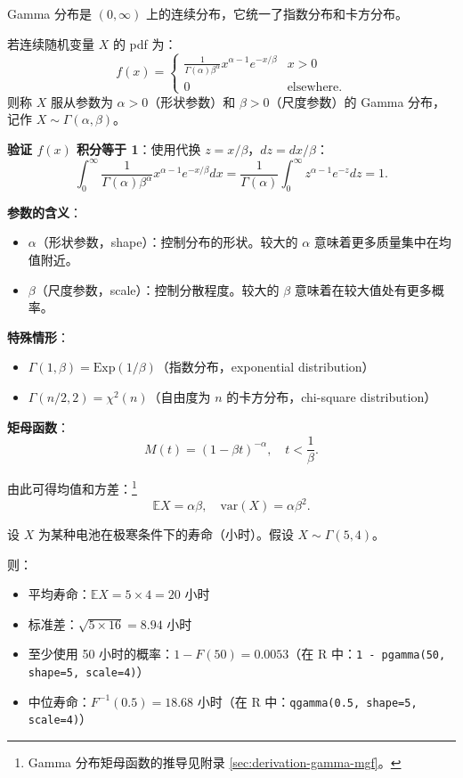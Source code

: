 Gamma 分布是 $(0, \infty)$ 上的连续分布，它统一了指数分布和卡方分布。

\begin{definition}[Gamma 分布]\label{def:gamma-distribution-ch3}
若连续随机变量 $X$ 的 pdf 为：
\[
f(x) = \begin{cases}
\frac{1}{\Gamma(\alpha)\beta^{\alpha}} x^{\alpha-1} e^{-x/\beta} & x > 0 \\[4pt]
0 & \text{elsewhere}.
\end{cases}
\label{eq:gamma-pdf-ch3}
\]
则称 $X$ 服从参数为 $\alpha > 0$（形状参数）和 $\beta > 0$（尺度参数）的 Gamma 分布，记作 $X \sim \Gamma(\alpha, \beta)$。
\end{definition}

\textbf{验证 $f(x)$ 积分等于 1}：使用代换 $z = x/\beta$，$dz = dx/\beta$：
\[
\int_{0}^{\infty} \frac{1}{\Gamma(\alpha)\beta^{\alpha}} x^{\alpha-1} e^{-x/\beta} dx = \frac{1}{\Gamma(\alpha)} \int_{0}^{\infty} z^{\alpha-1} e^{-z} dz = 1.
\]

\textbf{参数的含义}：
\begin{itemize}
\item $\alpha$（形状参数，shape）：控制分布的形状。较大的 $\alpha$ 意味着更多质量集中在均值附近。
\item $\beta$（尺度参数，scale）：控制分散程度。较大的 $\beta$ 意味着在较大值处有更多概率。
\end{itemize}

\textbf{特殊情形}：
\begin{itemize}
\item $\Gamma(1, \beta) = \text{Exp}(1/\beta)$（指数分布，exponential distribution）
\item $\Gamma(n/2, 2) = \chi^{2}(n)$（自由度为 $n$ 的卡方分布，chi-square distribution）
\end{itemize}

\textbf{矩母函数}：
\[
M(t) = (1 - \beta t)^{-\alpha}, \quad t < \frac{1}{\beta}.
\label{eq:gamma-mgf-ch3}
\]

由此可得均值和方差：\footnote{Gamma 分布矩母函数的推导见附录 \cref{sec:derivation-gamma-mgf}。}
\[
\mathbb{E}X = \alpha\beta, \quad \text{var}(X) = \alpha\beta^{2}.
\label{eq:gamma-moments-ch3}
\]

\begin{example}[电池寿命]\label{ex:battery-lifetime-ch3}
设 $X$ 为某种电池在极寒条件下的寿命（小时）。假设 $X \sim \Gamma(5, 4)$。

则：
\begin{itemize}
\item 平均寿命：$\mathbb{E}X = 5 \times 4 = 20$ 小时
\item 标准差：$\sqrt{5 \times 16} = 8.94$ 小时
\item 至少使用 50 小时的概率：$1 - F(50) = 0.0053$（在 R 中：\texttt{1 - pgamma(50, shape=5, scale=4)}）
\item 中位寿命：$F^{-1}(0.5) = 18.68$ 小时（在 R 中：\texttt{qgamma(0.5, shape=5, scale=4)}）
\end{itemize}
\end{example}


